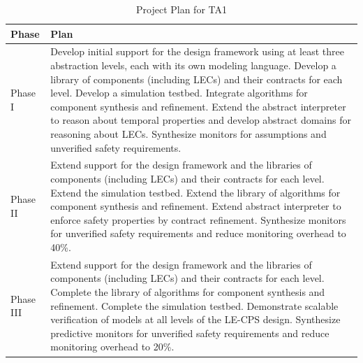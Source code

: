 \begin{table}[h!]
\caption{Project Plan for TA1}
  \centering
  {\footnotesize
\begin{tabular}{|m{.6in}|m{5.55in}|} 
\hline
\textbf{Phase} & \textbf{Plan} 
\\\hline
Phase I & 
Develop initial support for the design
framework using at least three abstraction levels, each with its own modeling language. Develop a library of components (including LECs) and their
contracts for each level. Develop a simulation testbed.  Integrate algorithms for component synthesis and refinement. Extend the abstract interpreter to reason about temporal properties and
develop abstract domains for reasoning about LECs.  Synthesize monitors for assumptions and unverified safety requirements.\\
\hline
Phase II & 
Extend support for the design framework and
the libraries of components (including LECs) and their contracts for
each level.  Extend the simulation testbed.  Extend the library of
algorithms for component synthesis and refinement.
Extend abstract interpreter to enforce safety properties by contract refinement. Synthesize monitors for unverified safety
requirements and reduce monitoring overhead to 40\%.\\ 
\hline
Phase III & 
Extend support for the design framework and
the libraries of components (including LECs) and their contracts for
each level.  Complete the library of
algorithms for component synthesis and refinement.
Complete the simulation testbed.
Demonstrate scalable verification of models at all levels of the LE-CPS design.
Synthesize predictive monitors for unverified safety requirements and reduce monitoring overhead to 20\%.\\\cline{1-2}

\hline
\end{tabular}
}
\end{table}

